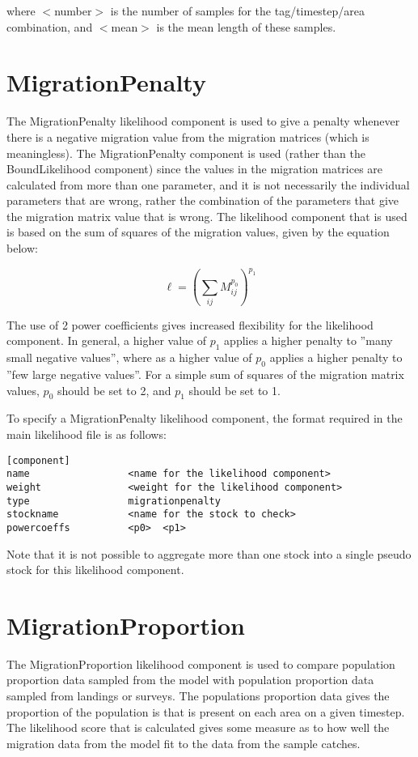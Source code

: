 \documentclass[10pt,twoside]{book}
\begin{document}
where $<$number$>$ is the number of samples for the tag/timestep/area combination, and $<$mean$>$ is the mean length of these samples.

\section{MigrationPenalty}\label{sec:migpenalty}
The MigrationPenalty likelihood component is used to give a penalty whenever there is a negative migration value from the migration matrices (which is meaningless).  The MigrationPenalty component is used (rather than the BoundLikelihood component) since the values in the migration matrices are calculated from more than one parameter, and it is not necessarily the individual parameters that are wrong, rather the combination of the parameters that give the migration matrix value that is wrong.  The likelihood component that is used is based on the sum of squares of the migration values, given by the equation below:

\begin{equation}\label{eq:migpenalty}
\ell = \left( \sum_{ij}^{} M_{ij}^{p_0} \right)^{p_1}
\end{equation}

\bigskip
The use of 2 power coefficients gives increased flexibility for the likelihood component.  In general, a higher value of $p_1$ applies a higher penalty to ''many small negative values'', where as a higher value of $p_0$ applies a higher penalty to ''few large negative values''.  For a simple sum of squares of the migration matrix values, $p_0$ should be set to 2, and $p_1$ should be set to 1.

\bigskip
To specify a MigrationPenalty likelihood component, the format required in the main likelihood file is as follows:

{\small\begin{verbatim}
[component]
name                 <name for the likelihood component>
weight               <weight for the likelihood component>
type                 migrationpenalty
stockname            <name for the stock to check>
powercoeffs          <p0>  <p1>
\end{verbatim}}

Note that it is not possible to aggregate more than one stock into a single pseudo stock for this likelihood component.

\section{MigrationProportion}\label{sec:migpro}
The MigrationProportion likelihood component is used to compare population proportion data sampled from the model with population proportion data sampled from landings or surveys.  The populations proportion data gives the proportion of the population is that is present on each area on a given timestep.  The likelihood score that is calculated gives some measure as to how well the migration data from the model fit to the data from the sample catches.
\end{document}
